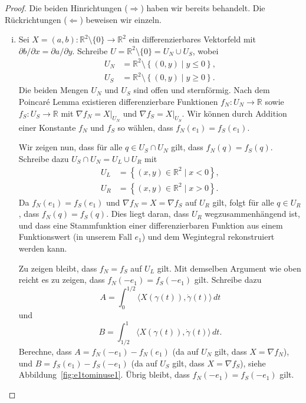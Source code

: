 \documentclass[../main.tex]{subfiles}
\begin{document}
\begin{proof}
  Die beiden Hinrichtungen ($\Rightarrow$) haben wir bereits behandelt.
  Die Rückrichtungen ($\Leftarrow$) beweisen wir einzeln.
  \begin{enumerate}[(i)]
    \item Sei $X = (a, b) \colon \mathbb{R}^2 \setminus \{0\} \to \mathbb{R}^2$ 
      ein differenzierbares Vektorfeld mit $\partial b / \partial x =
      \partial a / \partial y$.
      Schreibe $U = \mathbb{R}^2 \setminus \{0\} = U_N \cup U_S$, wobei
      \begin{align*}
        U_N & = \mathbb{R}^2 \setminus \left\{(0, y) \mid y \leq 0\right\}, \\
        U_S & = \mathbb{R}^2  \setminus \left\{(0, y) \mid y \geq 0 \right\}.
      \end{align*}
      Die beiden Mengen $U_N$ und $U_S$ sind offen und sternförmig.
      Nach dem Poincaré Lemma existieren 
      differenzierbare Funktionen $f_N \colon U_N \to \mathbb{R}$ 
      sowie $f_S \colon U_S \to \mathbb{R}$ mit
      $\nabla f_N = X|_{U_N}$ und $\nabla f_S = X|_{U_S}$.
      Wir können
      durch Addition einer Konstante 
      $f_N$ und $f_S$ so wählen, dass
      $f_N(e_1) = f_S(e_1)$.

      Wir zeigen nun, dass für alle $q \in U_S \cap U_N$ gilt,
      dass $f_N(q) = f_S(q)$.
      Schreibe dazu $U_S \cap U_N = U_L \cup U_R$ mit
      \begin{align*}
        U_L & = \left\{(x, y) \in \mathbb{R}^2 \mid x < 0 \right\}, \\
        U_R &= \left\{(x, y) \in \mathbb{R}^2 \mid x > 0\right\}.
      \end{align*}
      Da $f_N(e_1) = f_S(e_1)$ und $\nabla f_N = X = \nabla f_S$ 
      auf $U_R$ gilt, folgt für alle $q \in U_R$, dass
      $f_N(q) = f_S(q)$.
      Dies liegt daran, dass $U_R$ wegzusammenhängend ist,
      und dass eine Stammfunktion einer differenzierbaren Funktion
      aus einem Funktionswert (in unserem Fall $e_1$)
      und dem Wegintegral rekonstruiert werden kann.

      Zu zeigen bleibt, dass $f_N = f_S$ auf $U_L$ gilt.
      Mit demselben Argument wie oben reicht es zu zeigen,
      dass $f_N(-e_1) = f_S(-e_1)$ gilt.
      Schreibe dazu
      \[
        A = 
        \int_{0}^{1/2} \langle X(\gamma(t)), \dot \gamma(t) \rangle \, dt
      \]
      und
      \[
        B = 
        \int_{1/2}^{1} \langle X(\gamma(t)), \dot \gamma(t) \rangle \, dt.
      \]
      Berechne, dass
      \(
        A = f_N(-e_1) - f_N(e_1)
      \)
      (da auf $U_N$ gilt,
      dass $X = \nabla f_N$),
      und $B = f_S(e_1) - f_S(-e_1)$
      (da auf $U_S$ gilt, dass $X = 
      \nabla f_S$),
      siehe Abbildung~\ref{fig:e1tominuse1}.
      Übrig bleibt, dass
      $f_N(-e_1) = f_S(-e_1)$ gilt.


\end{enumerate}
\end{proof}
\end{document}
